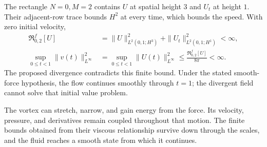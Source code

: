 The rectangle \(N=0,M=2\) contains \(U\) at spatial height \(3\)
and \(U_t\) at height \(1\). Their adjacent-row trace bounds
\(H^2\) at every time, which bounds the speed. With zero initial velocity,
\[
 \begin{aligned}
 \mathfrak R^f_{0,2}[U]
 &=\|U\|_{L^2(0,1;H^3)}^2
   +\|U_t\|_{L^2(0,1;H^1)}^2<\infty,\\
 \sup_{0\le t<1}\|v(t)\|_{L^\infty}^2
 &=\sup_{0\le t<1}\|U(t)\|_{L^\infty}^2
 \le\frac{\mathfrak R^f_{0,2}[U]}{8\pi}<\infty.
 \end{aligned}
\]
The proposed divergence contradicts this finite bound. Under the stated
smooth-force hypothesis, the flow continues smoothly through \(t=1\);
the divergent field cannot solve that initial value problem.

The vortex can stretch, narrow, and gain energy from the force. Its velocity,
pressure, and derivatives remain coupled throughout that motion. The
finite bounds obtained from their viscous relationship survive down through
the scales, and the fluid reaches a smooth state from which it continues.

\endgroup
